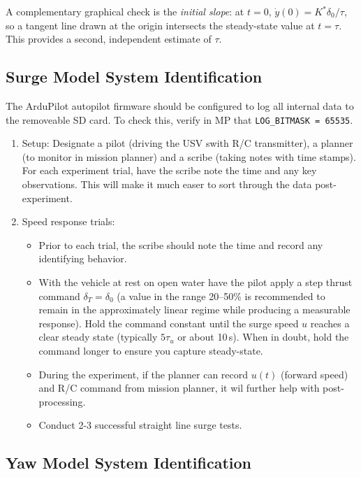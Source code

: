 \documentclass[../../book.tex]{subfiles}
\begin{document}
A complementary graphical check is the \emph{initial slope}: at $t=0$,
$\dot{y}(0) = K^*\delta_0/\tau$, so a tangent line drawn at the origin
intersects the steady-state value at $t = \tau$.  This provides a
second, independent estimate of $\tau$.

\subsection{Surge Model System Identification}

The ArduPilot autopilot firmware should be configured to log all internal data to the removeable SD card.  To check this, verify in MP that \texttt{LOG\_BITMASK = 65535}.

\begin{enumerate}
  \item Setup: Designate a pilot (driving the USV swith R/C transmitter), a planner (to monitor in mission planner) and a scribe (taking notes with time stamps).  For each experiment trial, have the scribe note the time and any key observations.  This will make it much easer to sort through the data post-experiment. 
  \item Speed response trials: 
  \begin{itemize}
    \item Prior to each trial, the scribe should note the time and record any identifying behavior.
    \item With the vehicle at rest on open water have the pilot apply a step
        thrust command $\delta_T = \delta_0$ (a value in the range 20--50\%
        is recommended to remain in the approximately linear regime while
        producing a measurable response).  Hold the command constant until
        the surge speed $u$ reaches a clear steady state (typically
        $5\tau_u$ or about 10\,s).  When in doubt, hold the command longer to ensure you capture steady-state.
      \item During the experiment, if the planner can record 
        $u(t)$ (forward speed) and R/C command from mission planner, it wil further help with post-processing.
      \item Conduct 2-3 successful straight line surge tests.
  \end{itemize}

\end{enumerate}


\subsection{Yaw Model System Identification}
\end{document}
